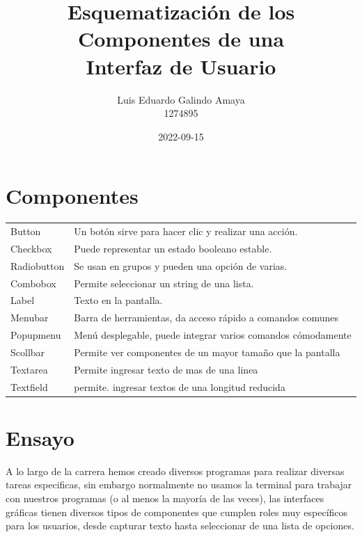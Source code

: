 \documentclass[12pt]{article}
\author{Luis Eduardo Galindo Amaya \\
1274895}
\date{2022-09-15}
\title{Esquematización de los Componentes de una \\
Interfaz de Usuario}
\begin{document}
\maketitle

\newcommand{\docente}{Manuel Castañón-Puga}
\newcommand{\asignatura}{Herramientas de Desarrollo de Software (40017)}
\newcommand{\semestre}{2022-2}

\setlength{\parskip}{1.2em}


\section*{Componentes}
\label{sec:org26a1052}
\begin{center}
\begin{tabular}{ll}
Button & Un botón sirve para hacer clic y realizar una acción.\\
Checkbox & Puede representar un estado booleano estable.\\
Radiobutton & Se usan en grupos y pueden una opción de varias.\\
Combobox & Permite seleccionar un string de una lista.\\
Label & Texto en la pantalla.\\
Menubar & Barra de herramientas, da acceso rápido a comandos comunes\\
Popupmenu & Menú desplegable, puede integrar varios comandos cómodamente\\
Scollbar & Permite ver componentes de un mayor tamaño que la pantalla\\
Textarea & Permite ingresar texto de mas de una linea\\
Textfield & permite. ingresar textos de una longitud reducida\\
\end{tabular}
\end{center}

\section*{Ensayo}
\label{sec:orgfb128f6}
A lo largo de la carrera hemos creado diversos programas para realizar diversas tareas especificas, sin embargo normalmente no usamos la terminal para trabajar con nuestros programas (o al menos la mayoría de las  veces), las interfaces gráficas tienen diversos tipos de componentes que cumplen roles muy específicos para los usuarios, desde capturar texto hasta seleccionar de una lista de opciones.
\end{document}
